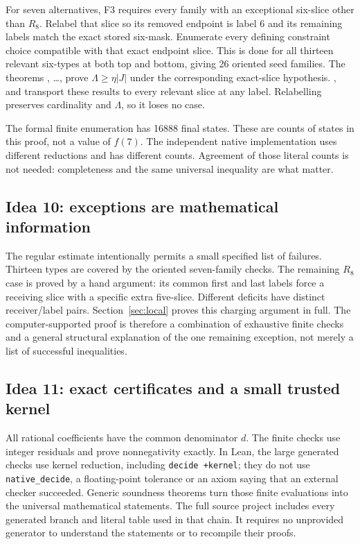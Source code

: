For seven alternatives, F3 requires every family with an exceptional
six-slice other than \(R_8\). Relabel that slice so its removed
endpoint is label 6 and its remaining labels match the exact stored
six-mask. Enumerate every defining constraint choice compatible with
that exact endpoint slice. This is done for all thirteen relevant
six-types at both top and bottom, giving 26 oriented seed families.
The theorems , \ldots,  prove
\(\Lambda\geq\eta|J|\) under the corresponding exact-slice hypothesis.
,  and  transport
these results to every relevant slice at any label. Relabelling
preserves cardinality and \(\Lambda\), so it loses no case.

The formal finite enumeration has 16888 final states. These are
counts of states in this proof, not a value of \(f(7)\). The independent
native implementation uses different reductions and has different
counts. Agreement of those literal counts is not needed: completeness
and the same universal inequality are what matter.

\subsection{Idea 10: exceptions are mathematical information}
The regular estimate intentionally permits a small specified list
of failures. Thirteen types are covered by the oriented seven-family
checks. The remaining \(R_8\) case is proved by a hand argument:
its common first and last labels force a receiving slice with a
specific extra five-slice. Different deficits have distinct
receiver/label pairs. Section~\ref{sec:local} proves this charging
argument in full. The computer-supported proof is therefore a
combination of exhaustive finite checks and a general structural
explanation of the one remaining exception, not merely a list of
successful inequalities.

\subsection{Idea 11: exact certificates and a small trusted kernel}
All rational coefficients have the common denominator \(d\).
The finite checks use integer residuals and prove nonnegativity
exactly. In Lean, the large generated checks use kernel reduction,
including \texttt{decide +kernel}; they do not use
\texttt{native\_decide}, a floating-point tolerance or an axiom saying
that an external checker succeeded. Generic soundness theorems turn
those finite evaluations into the universal mathematical statements.
The full source project includes every generated branch and literal
table used in that chain. It requires no unprovided generator to
understand the statements or to recompile their proofs.

